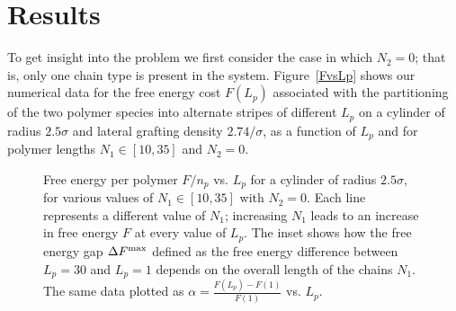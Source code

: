 \section{Results}

To get insight into the problem we first consider the case in which $N_2=0$; that is, only one chain type is present in the system. Figure~\ref{FvsLp} shows our numerical data for the free energy cost  $F(L_p)$ associated with the partitioning of the two polymer species into alternate stripes of different $L_p$ on a cylinder of radius $2.5\sigma$ and lateral grafting density $2.74/\sigma$, as a function of $L_p$ and for polymer lengths $N_1 \in \left[10,35\right]$ and $N_2 = 0$.
 
 \begin{figure}
	\begin{center}
	\end{center}
	\caption[Free energy and $\alpha$ as a function of $L_p$]{ Free energy per polymer $F/n_p$ vs. $L_p$ for a cylinder of radius $2.5\sigma$, for various values of $N_1 \in \left[10,35\right]$ with $N_2 = 0$.  Each line represents a different value of $N_1$; increasing $N_1$ leads to an increase in free energy $F$ at every value of $L_p$. The inset shows how the free energy gap $\Delta F^{\rm max}$ defined as the free energy difference between $L_p=30$ and  $L_p=1$
depends on the overall length of the chains $N_1$. The same data plotted as $\alpha = \frac{F(L_p)-F(1)}{F(1)}$ vs. $L_p$.}
\end{figure}

